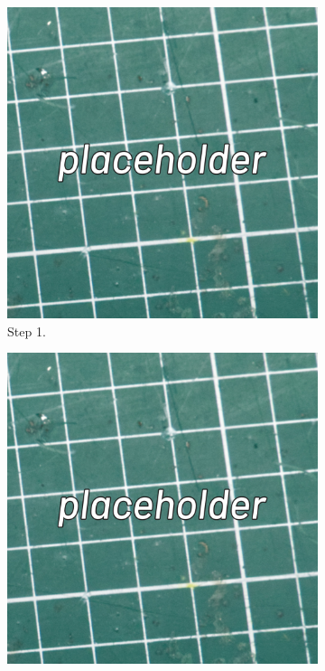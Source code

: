 \documentclass[12pt, a4paper]{article}
\begin{document}
\begin{figure}[H]
    \centering
    \begin{subfigure}{0.3\textwidth}
        \includegraphics[width=\textwidth]{images/placeholder.jpg}
        \caption*{Step 1.}
    \end{subfigure}
    \hspace{2mm}
    \begin{subfigure}{0.3\textwidth}
        \includegraphics[width=\textwidth]{images/placeholder.jpg}

\end{subfigure}
\end{figure}
\end{document}

